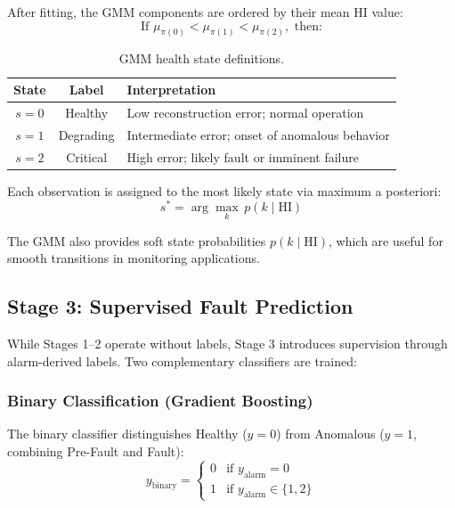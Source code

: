\documentclass[preprint,12pt]{elsarticle}
\begin{document}
After fitting, the GMM components are ordered by their mean HI value:
\begin{equation}
    \text{If } \mu_{\pi(0)} < \mu_{\pi(1)} < \mu_{\pi(2)}, \text{ then:}
\end{equation}

\begin{table}[H]
\centering
\caption{GMM health state definitions.}
\label{tab:gmm_states}
\begin{tabular}{ccl}
\toprule
State & Label & Interpretation \\
\midrule
$s = 0$ & Healthy & Low reconstruction error; normal operation \\
$s = 1$ & Degrading & Intermediate error; onset of anomalous behavior \\
$s = 2$ & Critical & High error; likely fault or imminent failure \\
\bottomrule
\end{tabular}
\end{table}

Each observation is assigned to the most likely state via maximum a posteriori:
\begin{equation}
    s^* = \arg\max_k \, p(k \mid \mathrm{HI})
\end{equation}

The GMM also provides soft state probabilities $p(k \mid \mathrm{HI})$, which are useful for smooth transitions in monitoring applications.

\subsection{Stage 3: Supervised Fault Prediction}
\label{sec:supervised}

While Stages 1--2 operate without labels, Stage 3 introduces supervision through alarm-derived labels. Two complementary classifiers are trained:

\subsubsection{Binary Classification (Gradient Boosting)}

The binary classifier distinguishes Healthy ($y=0$) from Anomalous ($y=1$, combining Pre-Fault and Fault):
\begin{equation}
    y_{\mathrm{binary}} = \begin{cases} 0 & \text{if } y_{\mathrm{alarm}} = 0 \\ 1 & \text{if } y_{\mathrm{alarm}} \in \{1, 2\} \end{cases}
\end{equation}
\end{document}
